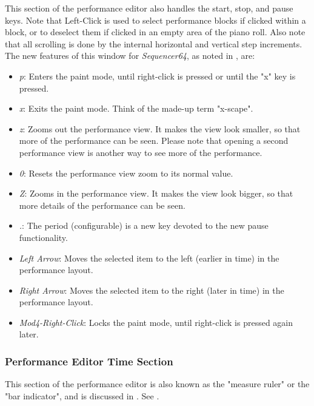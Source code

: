    This section of the performance editor also handles the start, stop, and
   pause keys.
   Note that Left-Click is used to select performance blocks if clicked within
   a block, or to deselect them if clicked in an empty area of the piano roll.
   Also note that all scrolling is done by the internal horizontal and vertical
   step increments.
   The new features of this window for \textsl{Sequencer64},
   as noted in , are:

   \begin{itemize}
      \item \textsl{p}:  Enters the paint mode, until right-click is pressed or
         until the "x" key is pressed.
      \item \textsl{x}:  Exits the paint mode.  Think of the made-up term
         "x-scape".
      \item \textsl{z}:  Zooms out the performance view.  It makes the view
         look smaller, so that more of the performance can be seen.  Please
         note that opening a second performance view is another way to see more
         of the performance.
      \item \textsl{0}:  Resets the performance view zoom to its normal value.
      \item \textsl{Z}:  Zooms in the performance view.  It makes the view
         look bigger, so that more details of the performance can be seen.
      \item \textsl{.}:  The period (configurable) is a new key devoted to the
         new pause functionality.
      \item \textsl{Left Arrow}:  Moves the selected item to the left (earlier
         in time) in the performance layout.
      \item \textsl{Right Arrow}:  Moves the selected item to the right (later
         in time) in the performance layout.
      \item \textsl{Mod4-Right-Click}:  Locks the paint mode, until right-click
         is pressed again later.
   \end{itemize}

\subsubsection{Performance Editor Time Section}
\label{subsubsec:kbd_mouse_performance_editor_time_section}

   This section of the performance editor is also known as the "measure ruler"
   or the "bar indicator", and is discussed in
   .
   See .

